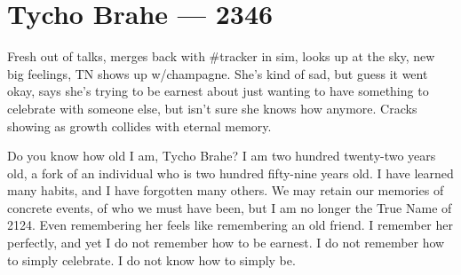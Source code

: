 \hypertarget{tycho-brahe-2346}{%
\chapter{Tycho Brahe — 2346}\label{tycho-brahe-2346}}

Fresh out of talks, merges back with \#tracker in sim, looks up at the sky, new big feelings, TN shows up w/champagne. She's kind of sad, but guess it went okay, says she's trying to be earnest about just wanting to have something to celebrate with someone else, but isn't sure she knows how anymore. Cracks showing as growth collides with eternal memory.

Do you know how old I am, Tycho Brahe? I am two hundred twenty-two years old, a fork of an individual who is two hundred fifty-nine years old. I have learned many habits, and I have forgotten many others. We may retain our memories of concrete events, of who we must have been, but I am no longer the True Name of 2124. Even remembering her feels like remembering an old friend. I remember her perfectly, and yet I do not remember how to be earnest. I do not remember how to simply celebrate. I do not know how to simply be.

